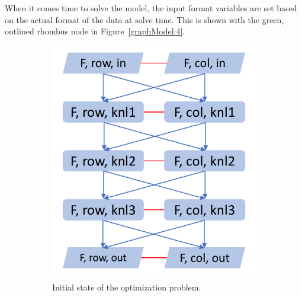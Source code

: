 \documentclass[sigconf,review=true]{acmart}
\begin{document}
When it comes time to solve the model, the input format variables are set based on the actual format of the data at solve time. This is shown with the green, outlined rhombus node in Figure~\ref{graphModel:4}.




\begin{figure}
	\begin{subfigure}[t]{0.2\textwidth}
		\includegraphics[page=1,width=\textwidth]{ModelProgression.pdf}
		\caption{Initial state of the optimization problem.}
		\label{graphModel:1}
	\end{subfigure}
	\hspace{0.05\textwidth}
	\begin{subfigure}[t]{0.2\textwidth}

\end{subfigure}
\end{figure}
\end{document}
